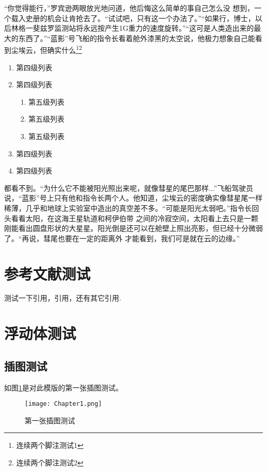 “你觉得能行，”罗宾逊两眼放光地问道，他后悔这么简单的事自己怎么没 想到，一个载入史册的机会让肯抢去了。“试试吧，只有这一个办法了。”“如果行，博士，以后林格一斐兹罗监测站将永远按产生1G重力的速度旋转。”“这可是人类造出来的最大的东西了。”“蓝影”号飞船的指令长看着舱外漆黑的太空说，他极力想象自己能看到尘埃云，但确实什么\footnote{连续两个脚注测试1}\footnote{连续两个脚注测试2}
\begin{enumerate}
	\item 第四级列表
	\item 第四级列表
	\begin{enumerate}
		\item 第五级列表
		\item 第五级列表
		\item 第五级列表
	\end{enumerate}
	\item 第四级列表
	\item 第四级列表
\end{enumerate}
都看不到。“为什么它不能被阳光照出来呢，就像彗星的尾巴那样...”飞船驾驶员说，“蓝影”号上只有他和指令长两个人。他知道，尘埃云的密度确实像彗星尾一样稀薄，几乎和地球上实验室中造出的真空差不多。“可能是阳光太弱吧。”指令长回头看看太阳，在这海王星轨道和柯伊伯带 之间的冷寂空间，太阳看上去只是一颗刚能看出圆盘形状的大星星。阳光倒是还可以在舱壁上照出亮影，但已经十分微弱了。“再说，彗尾也要在一定的距离外 才能看到，我们可是就在云的边缘。”

\section{参考文献测试}
测试一下引用\cite{shi_chinas_2010}，引用\cite{shi2010china,hata2014soi,muhammad2011development}，还有其它引用\cite{shi2010china,muhammad2011development,lamport1994latex}.

\section{浮动体测试}
\subsection{插图测试}
如图\ref{fig:first_image_tset}是对此模版的第一张插图测试。

\begin{figure}[htbp]
	\centering
	\texttt{[image: Chapter1.png]}
	\caption{第一张插图测试}\label{fig:first_image_tset}
\end{figure}

